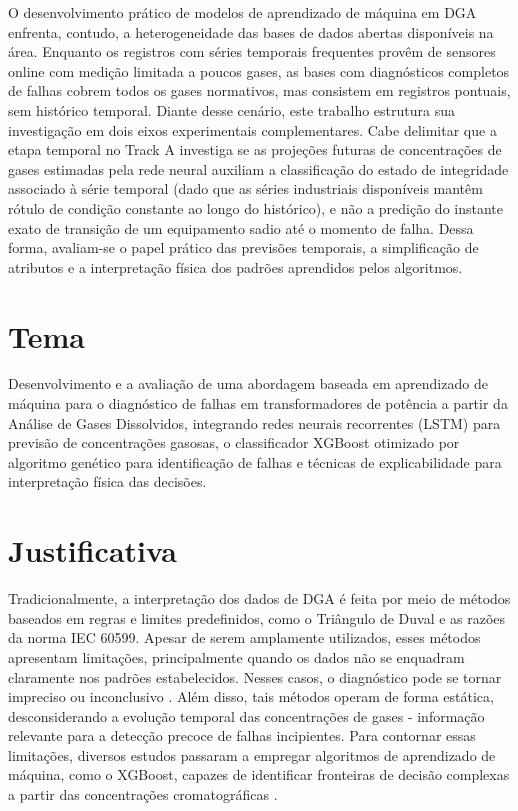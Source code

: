 O desenvolvimento prático de modelos de aprendizado de máquina em DGA enfrenta, contudo, a heterogeneidade das bases de dados abertas disponíveis na área. Enquanto os registros com séries temporais frequentes provêm de sensores online com medição limitada a poucos gases, as bases com diagnósticos completos de falhas cobrem todos os gases normativos, mas consistem em registros pontuais, sem histórico temporal. Diante desse cenário, este trabalho estrutura sua investigação em dois eixos experimentais complementares. Cabe delimitar que a etapa temporal no Track A investiga se as projeções futuras de concentrações de gases estimadas pela rede neural auxiliam a classificação do estado de integridade associado à série temporal (dado que as séries industriais disponíveis mantêm rótulo de condição constante ao longo do histórico), e não a predição do instante exato de transição de um equipamento sadio até o momento de falha. Dessa forma, avaliam-se o papel prático das previsões temporais, a simplificação de atributos e a interpretação física dos padrões aprendidos pelos algoritmos.

\section{Tema}\label{sec:tema}

Desenvolvimento e a avaliação de uma abordagem baseada em aprendizado de máquina para o diagnóstico de falhas em transformadores de potência a partir da Análise de Gases Dissolvidos, integrando redes neurais recorrentes (LSTM) para previsão de concentrações gasosas, o classificador XGBoost otimizado por algoritmo genético para identificação de falhas e técnicas de explicabilidade para interpretação física das decisões.

\section{Justificativa}\label{sec:justificativa}

Tradicionalmente, a interpretação dos dados de DGA é feita por meio de métodos baseados em regras e limites predefinidos, como o Triângulo de Duval e as razões da norma IEC 60599. Apesar de serem amplamente utilizados, esses métodos apresentam limitações, principalmente quando os dados não se enquadram claramente nos padrões estabelecidos. Nesses casos, o diagnóstico pode se tornar impreciso ou inconclusivo \cite{alsakini2025}. Além disso, tais métodos operam de forma estática, desconsiderando a evolução temporal das concentrações de gases - informação relevante para a detecção precoce de falhas incipientes. Para contornar essas limitações, diversos estudos passaram a empregar algoritmos de aprendizado de máquina, como o XGBoost, capazes de identificar fronteiras de decisão complexas a partir das concentrações cromatográficas \cite{wu2021}.

